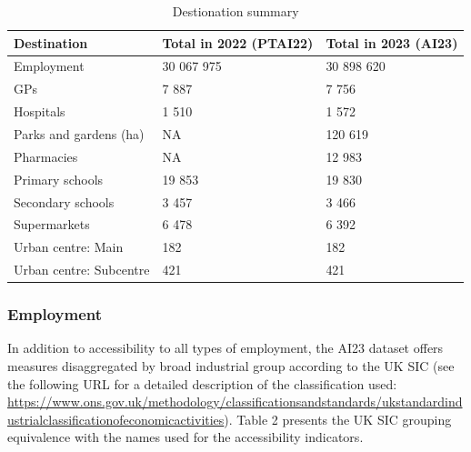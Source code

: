 \documentclass{article}
\begin{document}
\begin{table}[!h]

\caption{\label{tab:unnamed-chunk-2}Destionation summary}
\centering
\begin{tabu} to 
\toprule
Destination & Total in 2022
(PTAI22) & Total in 2023
(AI23)\\
\midrule
Employment & 30 067 975 & 30 898 620\\
GPs & 7 887 & 7 756\\
Hospitals & 1 510 & 1 572\\
Parks and gardens (ha) & NA & 120 619\\
Pharmacies & NA & 12 983\\
\addlinespace
Primary schools & 19 853 & 19 830\\
Secondary schools & 3 457 & 3 466\\
Supermarkets & 6 478 & 6 392\\
Urban centre: Main & 182 & 182\\
Urban centre: Subcentre & 421 & 421\\
\bottomrule
\end{tabu}
\end{table}

\hypertarget{employment}{%
\subsubsection{Employment}\label{employment}}

In addition to accessibility to all types of employment, the AI23
dataset offers measures disaggregated by broad industrial group
according to the UK SIC (see the following URL for a detailed
description of the classification used:
\url{https://www.ons.gov.uk/methodology/classificationsandstandards/ukstandardindustrialclassificationofeconomicactivities}).
Table 2 presents the UK SIC grouping equivalence with the names used for
the accessibility indicators.
\end{document}
